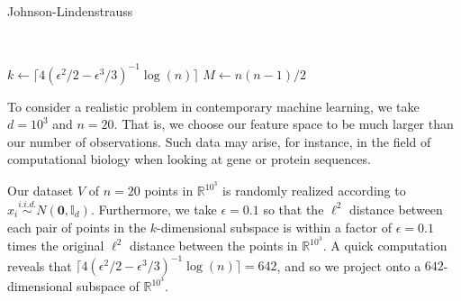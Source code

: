 \documentclass{article}
\begin{document}
\begin{algorithm}
\caption{Johnson-Lindenstrauss}\label{alg:one}
\texttt{\\}

$k \gets \lceil 4(\epsilon^2/2 - \epsilon^3/3)^{-1} \log(n) \rceil$ 
$M \gets n(n-1)/2$ 
\texttt{\\}


\end{algorithm}

\noindent 
To consider a realistic problem in contemporary machine learning, we take $d = 10^3$ and $n=20$. That is, we choose our feature space to be much larger than our number of observations. Such data may arise, for instance, in the field of computational biology when looking at gene or protein sequences.

\noindent
Our dataset $V$ of $n=20$ points in $\mathbb{R}^{10^3}$ is randomly realized according to $x_i \overset{i.i.d.}{\sim} N(\boldsymbol{0}, \mathbb{I}_d).$ Furthermore, we take $\epsilon = 0.1$ so that the $\ell^2$ distance between each pair of points in the $k$-dimensional subspace is within a factor of $\epsilon = 0.1$ times the original $\ell^2$ distance between the points in $\mathbb{R}^{10^3}$. A quick computation reveals that $\lceil 4(\epsilon^2/2 - \epsilon^3/3)^{-1} \log(n) \rceil = 642$, and so we project onto a $642$-dimensional subspace of $\mathbb{R}^{10^3}$.
\end{document}
